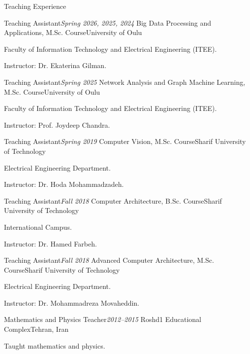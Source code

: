 \documentclass{resume} %
\begin{document}
\begin{rSection}{Teaching Experience}
\vspace{+.1cm}

\begin{rSubsection}{Teaching Assistant}{\em Spring 2026, 2025, 2024}
{Big Data Processing and Applications, M.Sc. Course}{University of Oulu}
    \item Faculty of Information Technology and Electrical Engineering (ITEE).
    \item Instructor: Dr. Ekaterina Gilman.
\end{rSubsection}

\begin{rSubsection}{Teaching Assistant}{\em Spring 2025}
{Network Analysis and Graph Machine Learning, M.Sc. Course}{University of Oulu}
    \item Faculty of Information Technology and Electrical Engineering (ITEE).
    \item Instructor: Prof. Joydeep Chandra.
\end{rSubsection}

\begin{rSubsection}{Teaching Assistant}{\em Spring 2019}
{Computer Vision, M.Sc. Course}{Sharif University of Technology}
    \item Electrical Engineering Department.
    \item Instructor: Dr. Hoda Mohammadzadeh.
\end{rSubsection}

\begin{rSubsection}{Teaching Assistant}{\em Fall 2018}
{Computer Architecture, B.Sc. Course}{Sharif University of Technology}
    \item International Campus.
    \item Instructor: Dr. Hamed Farbeh.
\end{rSubsection}

\begin{rSubsection}{Teaching Assistant}{\em Fall 2018}
{Advanced Computer Architecture, M.Sc. Course}{Sharif University of Technology}
    \item Electrical Engineering Department.
    \item Instructor: Dr. Mohammadreza Movaheddin.
\end{rSubsection}

\begin{rSubsection}{Mathematics and Physics Teacher}{\em 2012--2015}
{Roshd1 Educational Complex}{Tehran, Iran}
    \item Taught mathematics and physics.
\end{rSubsection}

\end{rSection}
\end{document}
